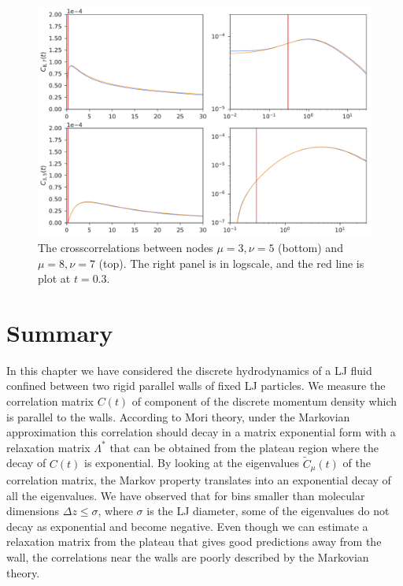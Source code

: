 \documentclass[b5paper,openright,10pt]{book}
\begin{document}
\newpage
\begin{figure}[h!]
  \centering
\includegraphics[width=\linewidth]{PredictionsCross-WALLS-17nodes}
\caption[Predicted crosscorrelations of $C(t)$ for a confined fluid - Thick bins]{The crosscorrelations between nodes $\mu=3,\nu=5$ (bottom) and  $\mu=8,\nu=7$ (top). The right panel is in logscale, and the red line is plot at $t=0.3$.}
\label{fig:PredictionsCross-WALLS-17nodes}
\end{figure}

\section{Summary}
In this chapter we have considered  the discrete hydrodynamics of  a LJ
fluid  confined  between   two  rigid  parallel  walls   of  fixed  LJ
particles. We  measure the correlation  matrix $C(t)$ of  component of
the discrete momentum density which is  parallel to the walls.  According
to  Mori theory,  under the  Markovian approximation  this correlation
should decay  in a  matrix exponential form  with a  relaxation matrix
$\Lambda^*$ that  can be  obtained from the  plateau region  where the
decay  of  $C(t)$  is  exponential.  By  looking  at  the  eigenvalues
$\tilde{C}_\mu(t)$  of the  correlation  matrix,  the Markov  property
translates into an  exponential decay of all the  eigenvalues. We have
observed that  for bins  smaller than  molecular dimensions  $\Delta z
\leq  \sigma$,  where  $\sigma$  is  the  LJ  diameter,  some  of  the
eigenvalues do  not decay  as exponential  and become  negative.  Even
though we can estimate a relaxation matrix from the plateau that gives
good predictions away  from the wall, the correlations  near the walls
are poorly described by the Markovian theory.
\end{document}
